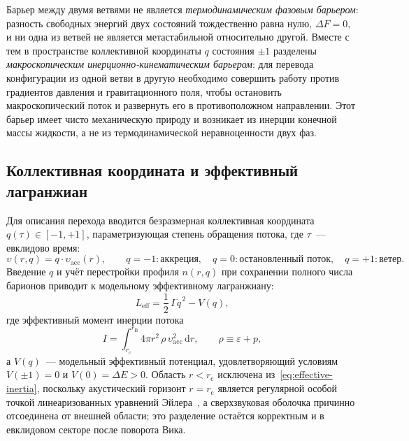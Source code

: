 \documentclass[12pt,a4paper,preprint]{elsarticle}
\begin{document}
            Барьер между двумя ветвями не является \emph{термодинамическим фазовым барьером}: разность свободных энергий двух состояний тождественно равна нулю, $\Delta F = 0$, и ни одна из ветвей не является метастабильной относительно другой. Вместе с тем в пространстве коллективной координаты $q$ состояния $\pm 1$ разделены \emph{макроскопическим инерционно-кинематическим барьером}: для перевода конфигурации из одной ветви в другую необходимо совершить работу против градиентов давления и гравитационного поля, чтобы остановить макроскопический поток и развернуть его в противоположном направлении. Этот барьер имеет чисто механическую природу и возникает из инерции конечной массы жидкости, а не из термодинамической неравноценности двух фаз.

        \subsection{Коллективная координата и эффективный лагранжиан}\label{subsec:collective-coordinate}
            Для описания перехода вводится безразмерная коллективная координата $q(\tau) \in [-1, +1]$, параметризующая степень обращения потока, где $\tau$~--- евклидово время:
            \begin{equation}
                \upsilon(r, q) = q \cdot \upsilon_{\mathrm{acc}}(r), \qquad q = -1: \text{аккреция}, \quad q = 0: \text{остановленный поток}, \quad q = +1: \text{ветер}.
                \label{eq:collective-coordinate}
            \end{equation}
            Введение $q$ и учёт перестройки профиля $n(r, q)$ при сохранении полного числа барионов приводит к модельному эффективному лагранжиану:
            \begin{equation}
                L_{\mathrm{eff}} = \frac{1}{2}\,I\,\dot{q}^{\,2} - V(q),
                \label{eq:effective-lagrangian}
            \end{equation}
            где эффективный момент инерции потока
            \begin{equation}
                I = \int_{r_{\mathrm{c}}}^{r_{\mathrm{B}}} 4\pi r^{2}\,\rho\,\upsilon_{\mathrm{acc}}^{2}\,\mathrm{d}r, \qquad \rho \equiv \varepsilon + p,
                \label{eq:effective-inertia}
            \end{equation}
            а $V(q)$~--- модельный эффективный потенциал, удовлетворяющий условиям $V(\pm 1) = 0$ и $V(0) = \Delta E > 0$. Область $r < r_{\mathrm{c}}$ исключена из~\eqref{eq:effective-inertia}, поскольку акустический горизонт $r = r_{\mathrm{c}}$ является регулярной особой точкой линеаризованных уравнений Эйлера~\cite{SemyannikovAV_PerturbationSpectrumOfMichelFlowAcousticVorticalAndEntropyModes_2026}, а сверхзвуковая оболочка причинно отсоединена от внешней области; это разделение остаётся корректным и в евклидовом секторе после поворота Вика.
            
\end{document}

